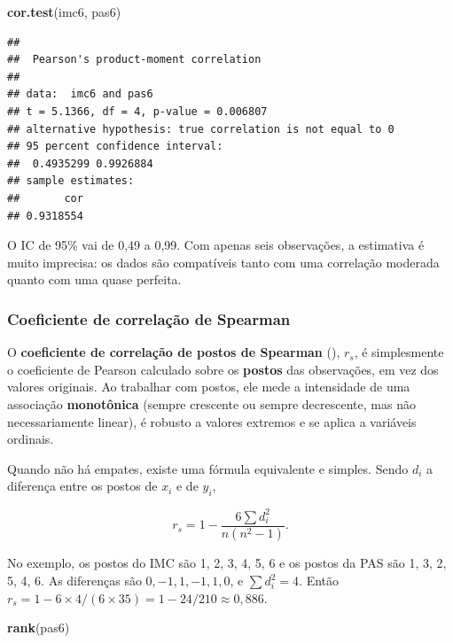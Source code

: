 \documentclass[
]{book}
\newenvironment{Shaded}{\begin{snugshade}}{\end{snugshade}}
\newcommand{\FunctionTok}[1]{\textcolor[rgb]{0.13,0.29,0.53}{\textbf{#1}}}
\newcommand{\NormalTok}[1]{#1}
\begin{document}
\begin{Shaded}
\begin{Highlighting}[]
\FunctionTok{cor.test}\NormalTok{(imc6, pas6)}
\end{Highlighting}
\end{Shaded}

\begin{verbatim}
## 
##  Pearson's product-moment correlation
## 
## data:  imc6 and pas6
## t = 5.1366, df = 4, p-value = 0.006807
## alternative hypothesis: true correlation is not equal to 0
## 95 percent confidence interval:
##  0.4935299 0.9926884
## sample estimates:
##       cor 
## 0.9318554
\end{verbatim}

O IC de 95\% vai de 0,49 a 0,99. Com apenas seis observações, a estimativa é muito imprecisa: os dados são compatíveis tanto com uma correlação moderada quanto com uma quase perfeita.

\subsubsection{Coeficiente de correlação de Spearman}\label{coeficiente-de-correlauxe7uxe3o-de-spearman}

O \textbf{coeficiente de correlação de postos de Spearman} (), \(r_s\), é simplesmente o coeficiente de Pearson calculado sobre os \textbf{postos} das observações, em vez dos valores originais. Ao trabalhar com postos, ele mede a intensidade de uma associação \textbf{monotônica} (sempre crescente ou sempre decrescente, mas não necessariamente linear), é robusto a valores extremos e se aplica a variáveis ordinais.

Quando não há empates, existe uma fórmula equivalente e simples. Sendo \(d_i\) a diferença entre os postos de \(x_i\) e de \(y_i\),

\[
r_s = 1 - \frac{6\sum d_i^2}{n(n^2 - 1)}.
\]

No exemplo, os postos do IMC são 1, 2, 3, 4, 5, 6 e os postos da PAS são 1, 3, 2, 5, 4, 6. As diferenças são \(0, -1, 1, -1, 1, 0\), e \(\sum d_i^2 = 4\). Então \(r_s = 1 - 6 \times 4/(6 \times 35) = 1 - 24/210 \approx 0{,}886\).

\begin{Shaded}
\begin{Highlighting}[]
\FunctionTok{rank}\NormalTok{(pas6)}
\end{Highlighting}
\end{Shaded}
\end{document}
